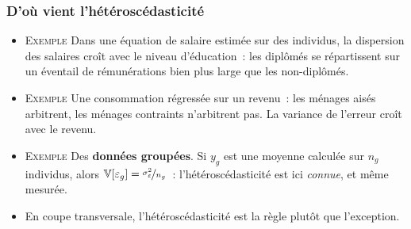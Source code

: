 \documentclass[10pt]{beamer}
\begin{document}
\begin{frame}
  \frametitle{D'où vient l'hétéroscédasticité}

  \begin{itemize}

  \item \textsc{Exemple} Dans une équation de salaire estimée sur des individus,
    la dispersion des salaires croît avec le niveau d'éducation~: les diplômés
    se répartissent sur un éventail de rémunérations bien plus large que les
    non-diplômés.\newline

  \item \textsc{Exemple} Une consommation régressée sur un revenu~: les ménages
    aisés arbitrent, les ménages contraints n'arbitrent pas. La variance de
    l'erreur croît avec le revenu.\newline

  \item \textsc{Exemple} Des \textbf{données groupées}. Si $y_g$ est une moyenne
    calculée sur $n_g$ individus, alors $\mathbb V[\varepsilon_g] =
    \nicefrac{\sigma_{\varepsilon}^2}{n_g}$~: l'hétéroscédasticité est ici \emph{connue}, et
    même mesurée.\newline

  \item[$\Rightarrow$] En coupe transversale, l'hétéroscédasticité est la règle
    plutôt que l'exception.\newline

  \end{itemize}

\end{frame}
\end{document}
